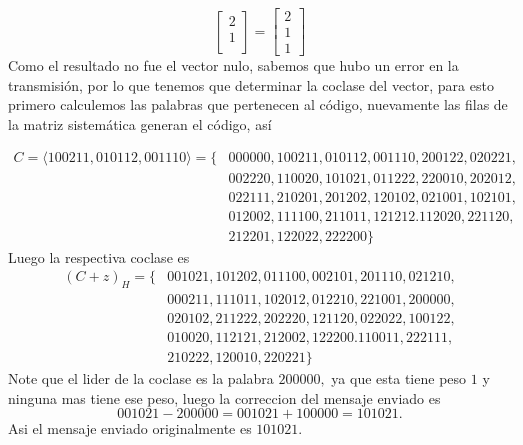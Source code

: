 \begin{itemize}
\begin{sols}
$$\begin{bmatrix}
            2\\
            1\\
        \end{bmatrix}=\begin{bmatrix}
            2\\
            1\\
            1
        \end{bmatrix}$$
        Como el resultado no fue el vector nulo, sabemos que hubo un error en la transmisión, por lo que tenemos que determinar la coclase del vector, para esto primero calculemos las palabras que pertenecen al código, nuevamente las filas de la matriz sistemática generan el código, así

        \begin{align*}
            C=\langle100211,010112,001110\rangle=\{&000000,100211,010112,001110,200122,020221,\\&002220,110020,101021,011222,220010,202012,\\&022111,210201,201202,120102,021001,102101,\\&012002,111100,211011,121212.112020,221120,\\&212201,122022,222200\}
        \end{align*}
        Luego la respectiva coclase es
        \begin{align*}
            (C+z)_H=\{&001021,101202,011100,002101,201110,021210,\\&000211,111011,102012,012210,221001,200000,\\&020102,211222,202220,121120,022022,100122,\\&010020,112121,212002,122200.110011,222111,\\&210222,120010,220221\}
        \end{align*}
        Note que el lider de la coclase es la palabra $200000,$ ya que esta tiene peso $1$ y ninguna mas tiene ese peso, luego la correccion del mensaje enviado es 
        $$001021-200000=001021+100000=101021.$$
        Asi el mensaje enviado originalmente es $101021.$
        
    \end{sols}
\end{itemize}

